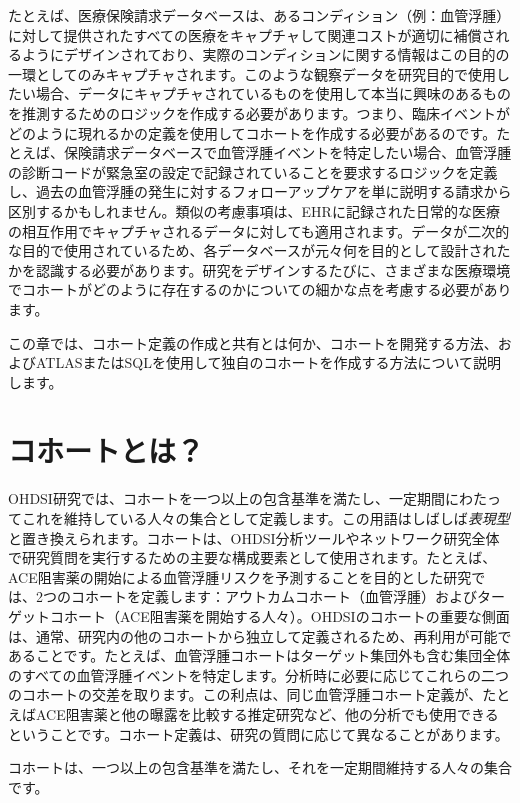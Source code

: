 \documentclass[
  11pt]{book}
\makeatletter
\newenvironment{kframe}{%
\medskip{}
\setlength{\fboxsep}{.8em}
 \def\at@end@of@kframe{}%
 \ifinner\ifhmode%
  \def\at@end@of@kframe{\end{minipage}}%
  \begin{minipage}{\columnwidth}%
 \fi\fi%
 \def\FrameCommand##1{\hskip\@totalleftmargin \hskip-\fboxsep
 \colorbox{myShadeColor}{##1}\hskip-\fboxsep
     \hskip-\linewidth \hskip-\@totalleftmargin \hskip\columnwidth}%
 \MakeFramed {\advance\hsize-\width
   \@totalleftmargin\z@ \linewidth\hsize
   \@setminipage}}%
 {\par\unskip\endMakeFramed%
 \at@end@of@kframe}
\newenvironment{rmdblock}[1]
  {
  \begin{itemize}
  \renewcommand{\labelitemi}{
    \raisebox{-.7\height}[0pt][0pt]{
      {\setkeys{Gin}{width=3em,keepaspectratio}\texttt{[image: images/\#1]}}
    }
  }
  \setlength{\fboxsep}{1em}
  \begin{kframe}
  \item
  }
  {
  \end{kframe}
  \end{itemize}
  }
\newenvironment{rmdimportant}
  {\begin{rmdblock}{important}}
  {\end{rmdblock}}
\theoremstyle{definition}
\theoremstyle{definition}
\theoremstyle{definition}
\theoremstyle{definition}
\theoremstyle{remark}
\makeatother
\begin{document}
たとえば、医療保険請求データベースは、あるコンディション（例：血管浮腫）に対して提供されたすべての医療をキャプチャして関連コストが適切に補償されるようにデザインされており、実際のコンディションに関する情報はこの目的の一環としてのみキャプチャされます。このような観察データを研究目的で使用したい場合、データにキャプチャされているものを使用して本当に興味のあるものを推測するためのロジックを作成する必要があります。つまり、臨床イベントがどのように現れるかの定義を使用してコホートを作成する必要があるのです。たとえば、保険請求データベースで血管浮腫イベントを特定したい場合、血管浮腫の診断コードが緊急室の設定で記録されていることを要求するロジックを定義し、過去の血管浮腫の発生に対するフォローアップケアを単に説明する請求から区別するかもしれません。類似の考慮事項は、EHRに記録された日常的な医療の相互作用でキャプチャされるデータに対しても適用されます。データが二次的な目的で使用されているため、各データベースが元々何を目的として設計されたかを認識する必要があります。研究をデザインするたびに、さまざまな医療環境でコホートがどのように存在するのかについての細かな点を考慮する必要があります。

この章では、コホート定義の作成と共有とは何か、コホートを開発する方法、およびATLASまたはSQLを使用して独自のコホートを作成する方法について説明します。

\section{コホートとは？}\label{ux30b3ux30dbux30fcux30c8ux3068ux306f}

OHDSI研究では、コホートを一つ以上の包含基準を満たし、一定期間にわたってこれを維持している人々の集合として定義します。この用語はしばしば\emph{表現型}と置き換えられます。コホートは、OHDSI分析ツールやネットワーク研究全体で研究質問を実行するための主要な構成要素として使用されます。たとえば、ACE阻害薬の開始による血管浮腫リスクを予測することを目的とした研究では、2つのコホートを定義します：アウトカムコホート（血管浮腫）およびターゲットコホート（ACE阻害薬を開始する人々）。OHDSIのコホートの重要な側面は、通常、研究内の他のコホートから独立して定義されるため、再利用が可能であることです。たとえば、血管浮腫コホートはターゲット集団外も含む集団全体のすべての血管浮腫イベントを特定します。分析時に必要に応じてこれらの二つのコホートの交差を取ります。この利点は、同じ血管浮腫コホート定義が、たとえばACE阻害薬と他の曝露を比較する推定研究など、他の分析でも使用できるということです。コホート定義は、研究の質問に応じて異なることがあります。

\begin{rmdimportant}
コホートは、一つ以上の包含基準を満たし、それを一定期間維持する人々の集合です。
\end{rmdimportant}
\end{document}
